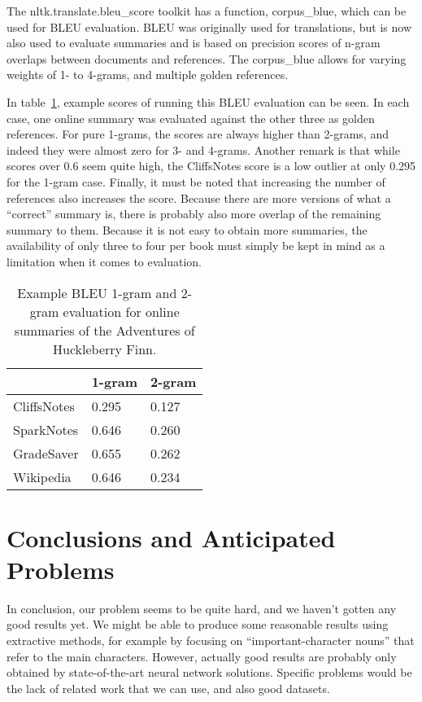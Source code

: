 The nltk.translate.bleu\_score toolkit has a function, corpus\_blue, which can
be used for BLEU evaluation. BLEU was originally used for translations, but is
now also used to evaluate summaries and is based on precision scores of
n-gram overlaps between documents and references. The corpus\_blue allows for
varying weights of 1- to 4-grams, and multiple golden references. 

In table~\ref{table:bleu_huckfinn}, example scores of running this BLEU
evaluation can be seen. In each case, one online summary was evaluated against
the other three as golden references. For pure 1-grams, the scores are always
higher than 2-grams, and indeed they were almost zero for 3- and 4-grams.
Another remark is that while scores over 0.6 seem quite high, the CliffsNotes
score is a low outlier at only 0.295 for the 1-gram case. Finally, it must be
noted that increasing the number of references also increases the score.
Because there are more versions of what a ``correct'' summary is, there is
probably also more overlap of the remaining summary to them. Because it is not
easy to obtain more summaries, the availability of only three to four per book
must simply be kept in mind as a limitation when it comes to evaluation.

\begin{table}[H]
	\centering
	\caption{Example BLEU 1-gram and 2-gram evaluation for online summaries of the Adventures of Huckleberry Finn.}\label{table:bleu_huckfinn}
	\begin{tabular}{l l l }
		\toprule
		\textbf{}   & \textbf{1-gram} & \textbf{2-gram} \\ \midrule
		CliffsNotes & 0.295           & 0.127           \\ \midrule
		SparkNotes  & 0.646           & 0.260           \\ \midrule
		GradeSaver  & 0.655           & 0.262           \\ \midrule
		Wikipedia   & 0.646           & 0.234           \\
		\bottomrule
	\end{tabular}
\end{table}


\section{Conclusions and Anticipated Problems}
In conclusion, our problem seems to be quite hard, and we haven't gotten any
good results yet. We might be able to produce some reasonable results using
extractive methods, for example by focusing on ``important-character nouns''
that refer to the main characters. However, actually good results are probably
only obtained by state-of-the-art neural network solutions. Specific problems
would be the lack of related work that we can use, and also good datasets.

